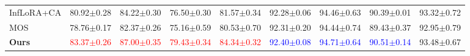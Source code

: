 \begin{table*}[ht]
{\begin{tabular}{l|cc|cc|cc|cc}
InfLoRA+CA\cite{liang2024inflora} & 80.92$\pm$0.28 & 84.22$\pm$0.30 & 76.50$\pm$0.30 & 81.57$\pm$0.34 & 92.28$\pm$0.06 & 94.46$\pm$0.63 & 90.39$\pm$0.01 & 93.32$\pm$0.72 \\
MOS\cite{sun2024mos} & 78.76$\pm$0.17 & 82.37$\pm$0.26 & 75.16$\pm$0.59 & 80.53$\pm$0.70  & 92.31$\pm$0.20 & 94.44$\pm$0.74 & 89.43$\pm$0.37 & 92.95$\pm$0.79\\
\midrule
\textbf{Ours} & \textcolor{red}{83.37$\pm$0.26} & \textcolor{red}{87.00$\pm$0.35} & \textcolor{red}{79.43$\pm$0.34} & \textcolor{red}{84.34$\pm$0.32} & \textcolor{blue}{92.40$\pm$0.08} & \textcolor{blue}{94.71$\pm$0.64} & \textcolor{blue}{90.51$\pm$0.14} & 93.48$\pm$0.67\\
\bottomrule
\end{tabular}
}
\vspace{-5mm}
\end{table*}

